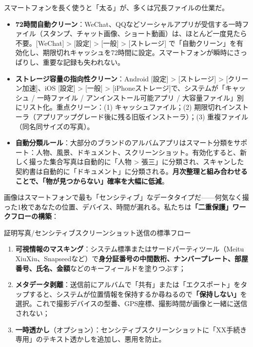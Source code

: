 
スマートフォンを長く使うと「太る」が、多くは冗長ファイルの仕業だ。

\begin{itemize}
  \item \textbf{72時間自動クリーン}：WeChat、QQなどソーシャルアプリが受信する一時ファイル（スタンプ、チャット画像、ショート動画）は、ほとんど一度見たら不要。[WeChat] > [設定] > [一般] > [ストレージ] で「自動クリーン」を有効化し、期限切れキャッシュを72時間に設定。スマートフォンが瞬時にさっぱりし、重要な記録も失われない。
  \item \textbf{ストレージ容量の指向性クリーン}：Android [設定] > [ストレージ] > [クリーン加速]、iOS [設定] > [一般] > [iPhoneストレージ]で、システムが「キャッシュ / 一時ファイル / アンインストール可能アプリ / 大容量ファイル」別にリスト化。重点クリーン：(1) キャッシュファイル；(2) 期限切れインストーラ（アプリアップグレード後に残る旧版インストーラ）；(3) 重複ファイル（同名同サイズの写真）。
  \item \textbf{自動分類ルール}：大部分のブランドのアルバムアプリはスマート分類をサポート：人物、風景、ドキュメント、スクリーンショット。有効化すると、新しく撮った集合写真は自動的に「人物 > 張三」に分類され、スキャンした契約書は自動的に「ドキュメント」に分類される。\textbf{月次整理と組み合わせることで、「物が見つからない」確率を大幅に低減}。
\end{itemize}


画像はスマートフォンで最も「センシティブ」なデータタイプだ——何気なく撮った1枚であなたの位置、デバイス、時間が漏れる。私たちは\textbf{「二重保護」ワークフローの構築}：

\begin{tcbwarn}{証明写真/センシティブスクリーンショット送信の標準フロー}
\begin{enumerate}
  \item \textbf{可視情報のマスキング}：システム標準またはサードパーティツール（Meitu XiuXiu、Snapseedなど）で\textbf{身分証番号の中間数桁、ナンバープレート、部屋番号、氏名、金額}などのキーフィールドを塗りつぶす；
  \item \textbf{メタデータ剥離}：送信前にアルバムで「共有」または「エクスポート」をタップすると、システムが位置情報を保持するか尋ねるので\textbf{「保持しない」}を選択。これで撮影デバイスの型番、GPS座標、撮影時間が画像と一緒に送信されない；
  \item \textbf{一時透かし}（オプション）：センシティブスクリーンショットに「XX手続き専用」のテキスト透かしを追加し、悪用を防止。
\end{enumerate}

\end{tcbwarn}

